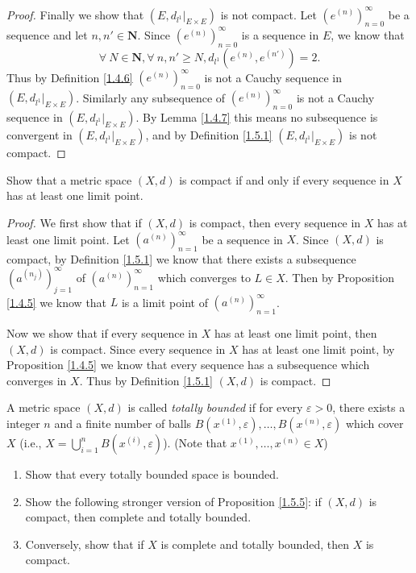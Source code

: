 \begin{proof}
    Finally we show that \((E, d_{l^1}|_{E \times E})\) is not compact.
    Let \((e^{(n)})_{n = 0}^\infty\) be a sequence and let \(n, n' \in \mathbf{N}\).
    Since \((e^{(n)})_{n = 0}^\infty\) is a sequence in \(E\), we know that
    \[
        \forall\ N \in \mathbf{N}, \forall\ n, n' \geq N, d_{l^1}(e^{(n)}, e^{(n')}) = 2.
    \]
    Thus by Definition \ref{1.4.6} \((e^{(n)})_{n = 0}^\infty\) is not a Cauchy sequence in \((E, d_{l^1}|_{E \times E})\).
    Similarly any subsequence of \((e^{(n)})_{n = 0}^\infty\) is not a Cauchy sequence in \((E, d_{l^1}|_{E \times E})\).
    By Lemma \ref{1.4.7} this means no subsequence is convergent in \((E, d_{l^1}|_{E \times E})\), and by Definition \ref{1.5.1} \((E, d_{l^1}|_{E \times E})\) is not compact.
\end{proof}

\begin{exercise}\label{ex 1.5.9}
    Show that a metric space \((X, d)\) is compact if and only if every sequence in \(X\) has at least one limit point.
\end{exercise}

\begin{proof}
    We first show that if \((X, d)\) is compact, then every sequence in \(X\) has at least one limit point.
    Let \((a^{(n)})_{n = 1}^\infty\) be a sequence in \(X\).
    Since \((X, d)\) is compact, by Definition \ref{1.5.1} we know that there exists a subsequence \((a^{(n_j)})_{j = 1}^\infty\) of \((a^{(n)})_{n = 1}^\infty\) which converges to \(L \in X\).
    Then by Proposition \ref{1.4.5} we know that \(L\) is a limit point of \((a^{(n)})_{n = 1}^\infty\).

    Now we show that if every sequence in \(X\) has at least one limit point, then \((X, d)\) is compact.
    Since every sequence in \(X\) has at least one limit point, by Proposition \ref{1.4.5} we know that every sequence has a subsequence which converges in \(X\).
    Thus by Definition \ref{1.5.1} \((X, d)\) is compact.
\end{proof}

\begin{exercise}\label{ex 1.5.10}
    A metric space \((X, d)\) is called \emph{totally bounded} if for every \(\varepsilon > 0\), there exists a integer \(n\) and a finite number of balls \(B(x^{(1)}, \varepsilon), \dots, B(x^{(n)}, \varepsilon)\) which cover \(X\) (i.e., \(X = \bigcup_{i = 1}^n B(x^{(i)}, \varepsilon)\)).
    (Note that \(x^{(1)}, \dots, x^{(n)} \in X\))
    \begin{enumerate}
        \item Show that every totally bounded space is bounded.
        \item Show the following stronger version of Proposition \ref{1.5.5}:
              if \((X, d)\) is compact, then complete and totally bounded.
        \item Conversely, show that if \(X\) is complete and totally bounded, then \(X\) is compact.
    \end{enumerate}
\end{exercise}

